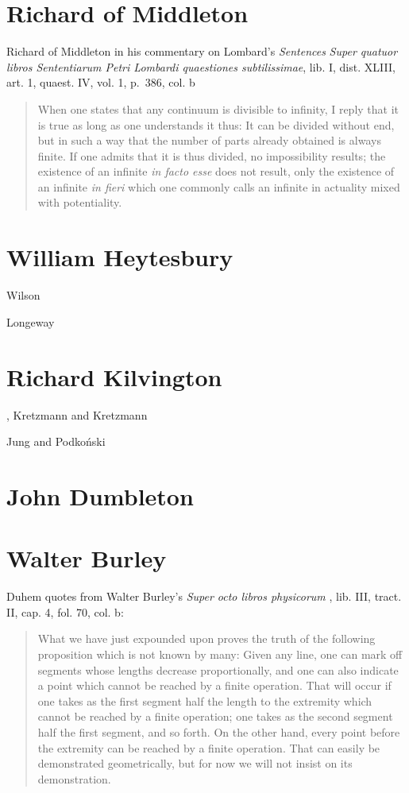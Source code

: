 \documentclass{amsart}
\theoremstyle{definition}
\begin{document}
\section{Richard of Middleton}
Richard of Middleton in his commentary on Lombard's {\em Sentences}  {\em Super quatuor libros Sententiarum Petri Lombardi quaestiones subtilissimae}, lib. I, dist. XLIII, art. 1, quaest. IV, vol. 1, p.~386, col. b \cite[p.~79]{ariew}
\begin{quote}
When one states that any continuum is divisible to infinity, I reply that it is true as long as one understands it thus: It can be divided without end, but in such a way that the number
of parts already obtained is always finite. If one admits that it is thus divided, no impossibility results; the existence of an infinite {\em in facto esse} does not result,
only the existence of an infinite {\em in fieri} which one commonly calls an infinite in actuality mixed with
potentiality.
\end{quote}

\section{William Heytesbury}
Wilson \cite{wilson}

Longeway \cite{longeway}

\section{Richard Kilvington},
Kretzmann and Kretzmann \cite{kilvington}

Jung and Podko\'nski \cite{jung}

\section{John Dumbleton}

\section{Walter Burley}
Duhem \cite[p.~57]{ariew} quotes from Walter Burley's {\em Super octo libros physicorum} \cite{burley}, lib. III, tract. II, cap. 4, fol. 70, col. b:
\begin{quote}
What we have just expounded upon proves the truth of the following proposition which is not known by many: Given any line, one can mark off segments whose lengths decrease proportionally, and one can also indicate a point which cannot be reached by a finite operation.
That will occur if one takes as the first segment half the length to the extremity which cannot be reached by a finite operation; one takes as the second segment half the first
segment, and so forth. On the other hand, every point before the extremity can be reached by a finite operation. That can easily be demonstrated geometrically, but for now
we will not insist on its demonstration.
\end{quote}
\end{document}
